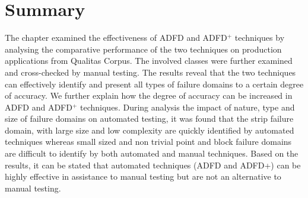 \section{Summary} \label{sec:conclusion}

The chapter examined the effectiveness of ADFD and ADFD$^+$ techniques by analysing the comparative performance of the two techniques on production applications from Qualitas Corpus. The involved classes were further examined and cross-checked by manual testing. The results reveal that the two techniques can effectively identify and present all types of failure domains to a certain degree of accuracy. We further explain how the degree of accuracy can be increased in ADFD and ADFD$^+$ techniques. 
During analysis the impact of nature, type and size of failure domains on automated testing, it was found that the strip failure domain, with large size and low complexity are quickly identified by automated techniques whereas small sized and non trivial point and block failure domains are difficult to identify by both automated and manual techniques. Based on the results, it can be stated that automated techniques (ADFD and ADFD+) can be highly effective in assistance to manual testing but are not an alternative to manual testing.  

